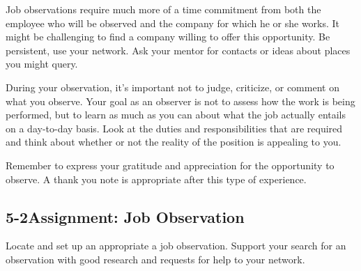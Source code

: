 Job observations require much more of a time commitment from both the employee who will be observed and the company for which he or she works. It might be challenging to find a company willing to offer this opportunity. Be persistent, use your network. Ask your mentor for contacts or ideas about places you might query.

During your observation, it's important not to judge, criticize, or comment on what you observe. Your goal as an observer is not to assess how the work is being performed, but to learn as much as you can about what the job actually entails on a day-to-day basis. Look at the duties and responsibilities that are required and think about whether or not the reality of the position is appealing to you.

Remember to express your gratitude and appreciation for the opportunity to observe. A thank you note is appropriate after this type of experience.

\pagebreak \subsection*{5-2\quad Assignment: Job Observation}
Locate and set up an appropriate a job observation. Support your search for an observation with good research and requests for help to your network.

